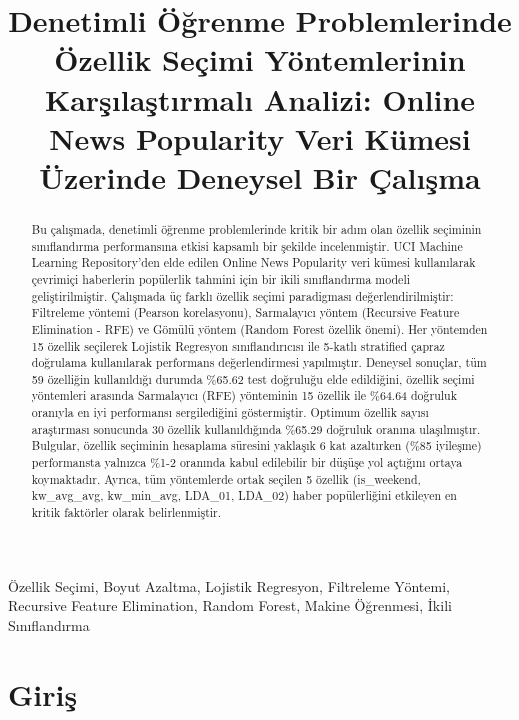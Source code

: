 \documentclass[conference]{IEEEtran}
\title{Denetimli Öğrenme Problemlerinde Özellik Seçimi Yöntemlerinin Karşılaştırmalı Analizi: Online News Popularity Veri Kümesi Üzerinde Deneysel Bir Çalışma}
\author{
\IEEEauthorblockN{Mohammed Izedin Mohammed}
\IEEEauthorblockA{STUDENT_ID_REMOVED\\
Bilgisayar Mühendisliği Bölümü\\
Yıldız Teknik Üniversitesi\\
İstanbul, Türkiye\\
Email: mohammed.izedin@std.yildiz.edu.tr}
}
\begin{document}
\maketitle

\begin{abstract}
Bu çalışmada, denetimli öğrenme problemlerinde kritik bir adım olan özellik seçiminin sınıflandırma performansına etkisi kapsamlı bir şekilde incelenmiştir. UCI Machine Learning Repository'den elde edilen Online News Popularity veri kümesi kullanılarak çevrimiçi haberlerin popülerlik tahmini için bir ikili sınıflandırma modeli geliştirilmiştir. Çalışmada üç farklı özellik seçimi paradigması değerlendirilmiştir: Filtreleme yöntemi (Pearson korelasyonu), Sarmalayıcı yöntem (Recursive Feature Elimination - RFE) ve Gömülü yöntem (Random Forest özellik önemi). Her yöntemden 15 özellik seçilerek Lojistik Regresyon sınıflandırıcısı ile 5-katlı stratified çapraz doğrulama kullanılarak performans değerlendirmesi yapılmıştır. Deneysel sonuçlar, tüm 59 özelliğin kullanıldığı durumda \%65.62 test doğruluğu elde edildiğini, özellik seçimi yöntemleri arasında Sarmalayıcı (RFE) yönteminin 15 özellik ile \%64.64 doğruluk oranıyla en iyi performansı sergilediğini göstermiştir. Optimum özellik sayısı araştırması sonucunda 30 özellik kullanıldığında \%65.29 doğruluk oranına ulaşılmıştır. Bulgular, özellik seçiminin hesaplama süresini yaklaşık 6 kat azaltırken (\%85 iyileşme) performansta yalnızca \%1-2 oranında kabul edilebilir bir düşüşe yol açtığını ortaya koymaktadır. Ayrıca, tüm yöntemlerde ortak seçilen 5 özellik (is\_weekend, kw\_avg\_avg, kw\_min\_avg, LDA\_01, LDA\_02) haber popülerliğini etkileyen en kritik faktörler olarak belirlenmiştir.
\end{abstract}

\begin{IEEEkeywords}
Özellik Seçimi, Boyut Azaltma, Lojistik Regresyon, Filtreleme Yöntemi, Recursive Feature Elimination, Random Forest, Makine Öğrenmesi, İkili Sınıflandırma
\end{IEEEkeywords}

\section{Giriş}
\end{document}
